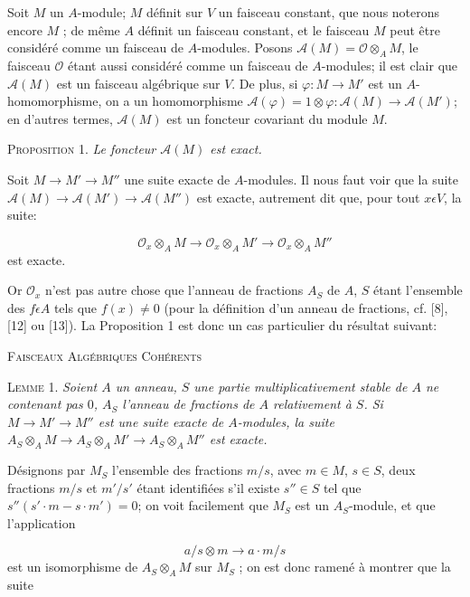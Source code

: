 Soit $M$ un $A$-module; $M$ définit sur $V$ un faisceau constant, que nous noterons encore $M$ ; de même $A$ définit un faisceau constant, et le faisceau $M$ peut être considéré comme un faisceau de $A$-modules. Posons $\mathcal{A}(M) = \mathcal{O} \otimes_A M$, le faisceau $\mathcal{O}$ étant aussi considéré comme un faisceau de $A$-modules; il est clair que $\mathcal{A}(M)$ est un faisceau algébrique sur $V$. De plus, si $\varphi : M \to M'$ est un $A$-homomorphisme, on a un homomorphisme $\mathcal{A}(\varphi) = 1 \otimes \varphi : \mathcal{A}(M) \to \mathcal{A}(M')$; en d'autres termes, $\mathcal{A}(M)$ est un foncteur covariant du module $M$.

\textsc{Proposition} 1. \textit{Le foncteur $\mathcal{A}(M)$ est exact.}

Soit $M \to M' \to M''$ une suite exacte de $A$-modules. Il nous faut voir que la suite $\mathcal{A}(M) \to \mathcal{A}(M') \to \mathcal{A}(M'')$ est exacte, autrement dit que, pour tout $x \epsilon V$, la suite:

\begin{equation*}
\mathcal{O}_x \otimes_A M \to \mathcal{O}_x \otimes_A M' \to \mathcal{O}_x \otimes_A M''
\end{equation*}
est exacte.

Or $\mathcal{O}_x$ n'est pas autre chose que l'anneau de fractions $A_S$ de $A$, $S$ étant l'ensemble des $f \epsilon A$ tels que $f(x) \neq 0$ (pour la définition d'un anneau de fractions, cf. [8], [12] ou [13]). La Proposition 1 est donc un cas particulier du résultat suivant:




\textsc{Faisceaux Algébriques Cohérents}

\textsc{Lemme} 1. \textit{Soient $A$ un anneau, $S$ une partie multiplicativement stable de $A$ ne contenant pas $0$, $A_S$ l'anneau de fractions de $A$ relativement à $S$. Si $M \to M' \to M''$ est une suite exacte de $A$-modules, la suite $A_S \otimes_A M \to A_S \otimes_A M' \to A_S \otimes_A M''$ est exacte.}

Désignons par $M_S$ l'ensemble des fractions $m/s$, avec $m \in M$, $s \in S$, deux fractions $m/s$ et $m'/s'$ étant identifiées s'il existe $s'' \in S$ tel que $s''(s' \cdot m - s \cdot m') = 0$; on voit facilement que $M_S$ est un $A_S$-module, et que l'application

\begin{equation*}
a/s \otimes m \to a \cdot m/s
\end{equation*}
est un isomorphisme de $A_S \otimes_A M$ sur $M_S$ ; on est donc ramené à montrer que la suite

